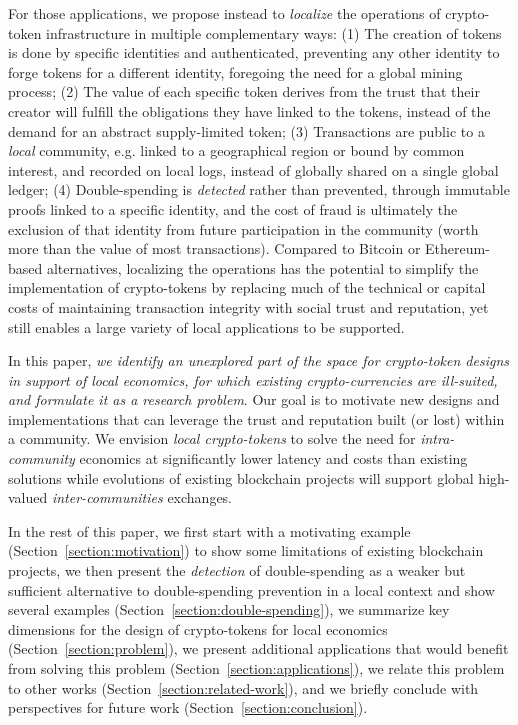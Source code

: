 \documentclass[sigplan,screen,10pt,review,anonymous]{acmart}
\begin{document}
For those applications, we propose instead to \textit{localize} the operations of crypto-token infrastructure in multiple complementary ways: (1) The creation of tokens is done by specific identities and authenticated, preventing any other identity to forge tokens for a different identity, foregoing the need for a global mining process; (2) The value of each specific token derives from the trust that their creator will fulfill the obligations they have linked to the tokens, instead of the demand for an abstract supply-limited token; (3) Transactions are public to a \textit{local} community, e.g. linked to a geographical region or bound by common interest, and recorded on local logs, instead of globally shared on a single global ledger; (4) Double-spending is \textit{detected} rather than prevented, through immutable proofs linked to a specific identity, and the cost of fraud is ultimately the exclusion of that identity from future participation in the community (worth more than the value of most transactions). Compared to Bitcoin or Ethereum-based alternatives, localizing the operations has the potential to simplify the implementation of crypto-tokens by replacing much of the technical or capital costs of maintaining transaction integrity with social trust and reputation, yet still enables a large variety of local applications to be supported.

In this paper, \textit{we identify an unexplored part of the space for crypto-token designs in support of local economics, for which existing crypto-currencies are ill-suited, and formulate it as a research problem}. Our goal is to motivate new designs and implementations that can leverage the trust and reputation built (or lost) within a community. We envision \textit{local crypto-tokens} to solve the need for \textit{intra-community} economics at significantly lower latency and costs than existing solutions while evolutions of existing blockchain projects will support global high-valued \textit{inter-communities} exchanges.

In the rest of this paper, we first start with a motivating example (Section~\ref{section:motivation}) to show some limitations of existing blockchain projects, we then present the \textit{detection} of double-spending as a weaker but sufficient alternative to double-spending prevention in a local context and show several examples (Section~\ref{section:double-spending}), we summarize key dimensions for the design of crypto-tokens for local economics (Section~\ref{section:problem}), we present additional applications that would benefit from solving this problem (Section~\ref{section:applications}), we relate this problem to other works (Section~\ref{section:related-work}), and we briefly conclude with perspectives for future work (Section~\ref{section:conclusion}).
\end{document}

